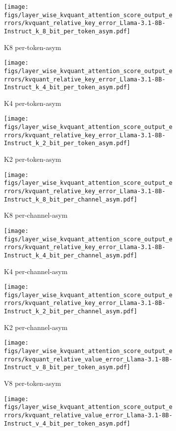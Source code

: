 \begin{figure}
    \centering
    \begin{subfigure}{0.25\columnwidth}
    \texttt{[image: figs/layer\_wise\_kvquant\_attention\_score\_output\_errors/kvquant\_relative\_key\_error\_Llama-3.1-8B-Instruct\_k\_8\_bit\_per\_token\_asym.pdf]}
    \caption{K8 per-token-asym}
    \end{subfigure}
    \begin{subfigure}{0.25\columnwidth}
    \texttt{[image: figs/layer\_wise\_kvquant\_attention\_score\_output\_errors/kvquant\_relative\_key\_error\_Llama-3.1-8B-Instruct\_k\_4\_bit\_per\_token\_asym.pdf]}
    \caption{K4 per-token-asym}
    \end{subfigure}
    \begin{subfigure}{0.25\columnwidth}
    \texttt{[image: figs/layer\_wise\_kvquant\_attention\_score\_output\_errors/kvquant\_relative\_key\_error\_Llama-3.1-8B-Instruct\_k\_2\_bit\_per\_token\_asym.pdf]}
    \caption{K2 per-token-asym}
    \end{subfigure}
    \begin{subfigure}{0.25\columnwidth}
    \texttt{[image: figs/layer\_wise\_kvquant\_attention\_score\_output\_errors/kvquant\_relative\_key\_error\_Llama-3.1-8B-Instruct\_k\_8\_bit\_per\_channel\_asym.pdf]}
    \caption{K8 per-channel-asym}
    \end{subfigure}
    \begin{subfigure}{0.25\columnwidth}
    \texttt{[image: figs/layer\_wise\_kvquant\_attention\_score\_output\_errors/kvquant\_relative\_key\_error\_Llama-3.1-8B-Instruct\_k\_4\_bit\_per\_channel\_asym.pdf]}
    \caption{K4 per-channel-asym}
    \end{subfigure}
    \begin{subfigure}{0.25\columnwidth}
    \texttt{[image: figs/layer\_wise\_kvquant\_attention\_score\_output\_errors/kvquant\_relative\_key\_error\_Llama-3.1-8B-Instruct\_k\_2\_bit\_per\_channel\_asym.pdf]}
    \caption{K2 per-channel-asym}
    \end{subfigure}
    \begin{subfigure}{0.25\columnwidth}
    \texttt{[image: figs/layer\_wise\_kvquant\_attention\_score\_output\_errors/kvquant\_relative\_value\_error\_Llama-3.1-8B-Instruct\_v\_8\_bit\_per\_token\_asym.pdf]}
    \caption{V8 per-token-asym}
    \end{subfigure}
    \begin{subfigure}{0.25\columnwidth}
    \texttt{[image: figs/layer\_wise\_kvquant\_attention\_score\_output\_errors/kvquant\_relative\_value\_error\_Llama-3.1-8B-Instruct\_v\_4\_bit\_per\_token\_asym.pdf]}

\end{subfigure}
\end{figure}
